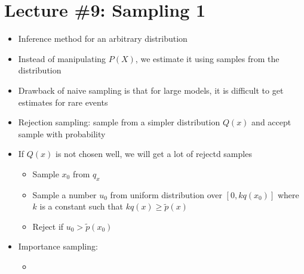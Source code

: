\documentclass[../main.tex]{subfiles}
\begin{document}
\section{Lecture \#9: Sampling 1}
\begin{itemize}
  \item Inference method for an arbitrary distribution
  \item Instead of manipulating $P(X)$, we estimate it using samples from the distribution
  \item Drawback of naive sampling is that for large models, it is difficult to get estimates for rare events
  \item Rejection sampling: sample from a simpler distribution $Q(x)$ and accept sample with probability
  \item If $Q(x)$ is not chosen well, we will get a lot of rejectd samples
  \begin{itemize}
    \item Sample $x_{0}$ from $q_{x}$
    \item Sample a number $u_{0}$ from uniform distribution over $[0, kq(x_{0})]$ where $k$ is a constant such that $kq(x) \geq \tilde{p}(x)$
    \item Reject if $u_{0} > \tilde{p}(x_{0})$
  \end{itemize}
  \item Importance sampling:
  \begin{itemize}
    \item
  \end{itemize}
\end{itemize}
\end{document}
